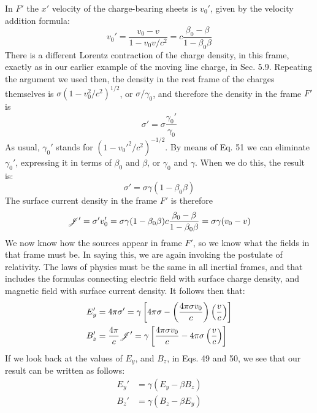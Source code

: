 In $F'$ the $x'$ velocity of the charge-bearing sheets is $v_0'$, given by
the velocity addition formula:
\begin{equation}
  v_0' = \frac{v_0-v}{1-v_0v/c^2} = c\frac{\beta_0-\beta}{1-\beta_0\beta}
\end{equation}
There is a different Lorentz contraction of the charge density, in this
frame, exactly as in our earlier example of the moving line charge,
in Sec. 5.9. Repeating the argument we used then, the density in
the rest frame of the charges themselves is $\sigma(1 - v_0^2/c^2)^{1/2}$, or $\sigma/\gamma_0$,
and therefore the density in the frame $F'$ is
\begin{equation}
  \sigma' = \sigma \frac{\gamma_0'}{\gamma_0}
\end{equation}
As usual, $\gamma_0'$ stands for $(1 - v_0'^2/c^2)^{-1/2}$. By means of Eq. 51 we
can eliminate $\gamma_0'$, expressing it in terms of $\beta_0$ and $\beta$, or $\gamma_0$ and $\gamma$.
When we do this, the result is:
\begin{equation}
  \sigma' = \sigma\gamma(1-\beta_0\beta)
\end{equation}
The surface current density in the frame $F'$ is therefore
\begin{equation}
  \mathscr{J}' = \sigma' v_0' = \sigma\gamma(1-\beta_0\beta)c\frac{\beta_0-\beta}{1-\beta_0\beta}
        = \sigma\gamma(v_0-v)
\end{equation}
We now know how the sources appear in frame $F'$, so we know what
the fields in that frame must be. In saying this, we are again invoking
the postulate of relativity. The laws of physics must be the same in
all inertial frames, and that includes the formulas connecting electric
field with surface charge density, and magnetic field with surface
current density. It follows then that:
\begin{align}
  E_y' &= 4\pi\sigma'
        = \gamma\left[4\pi\sigma-\left(\frac{4\pi\sigma v_0}{c}\right)\left(\frac{v}{c}\right)\right] \\
  B_z' &= \frac{4\pi}{c}\mathscr{J}'
        = \gamma\left[\frac{4\pi\sigma v_0}{c}-4\pi\sigma\left(\frac{v}{c}\right)\right] 
\end{align}
If we look back at the values of $E_y$, and $B_z$, in Eqs. 49 and 50, we see
that our result can be written as follows:
\begin{align*}
  E_y' &= \gamma(E_y - \beta B_z) \\
  B_z' &= \gamma(B_z - \beta E_y)
\end{align*}

